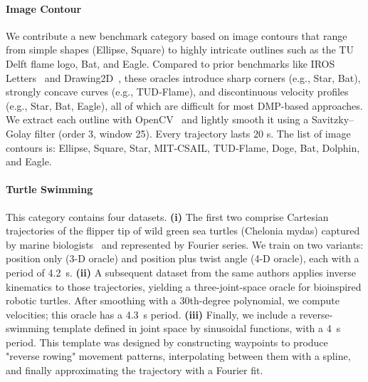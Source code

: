 \paragraph{Image Contour}
% 
We contribute a new benchmark category based on image contours that range from simple shapes (Ellipse, Square) to highly intricate outlines such as the TU Delft flame logo, Bat, and Eagle. Compared to prior benchmarks like IROS Letters~\citep{urain2020imitationflow} and Drawing2D~\citep{nawaz2024learning}, these oracles introduce sharp corners (e.g., Star, Bat), strongly concave curves (e.g., TUD‐Flame), and discontinuous velocity profiles (e.g., Star, Bat, Eagle), all of which are difficult for most DMP-based approaches.
We extract each outline with OpenCV~\citep{bradski2000opencv} and lightly smooth it using a Savitzky–Golay filter (order 3, window 25). Every trajectory lasts 20 s.
% 
The list of image contours is: Ellipse, Square, Star, MIT‐CSAIL, TUD‐Flame, Doge, Bat, Dolphin, and Eagle. 

\paragraph{Turtle Swimming}
This category contains four datasets.
\textbf{(i)} The first two comprise Cartesian trajectories of the flipper tip of wild green sea turtles (Chelonia mydas) captured by marine biologists~\citep{van2022new} and represented by Fourier series. We train on two variants: position only (3-D oracle) and position plus twist angle (4-D oracle), each with a period of \SI{4.2}{s}.
\textbf{(ii)} A subsequent dataset from the same authors applies inverse kinematics to those trajectories, yielding a three-joint-space oracle for bioinspired robotic turtles\citep{van2023soft}. After smoothing with a 30th-degree polynomial, we compute velocities; this oracle has a \SI{4.3}{s} period.
\textbf{(iii)} Finally, we include a reverse-swimming template defined in joint space by sinusoidal functions, with a \SI{4}{s} period. This template was designed by constructing waypoints to produce "reverse rowing" movement patterns, interpolating between them with a spline, and finally approximating the trajectory with a Fourier fit.

